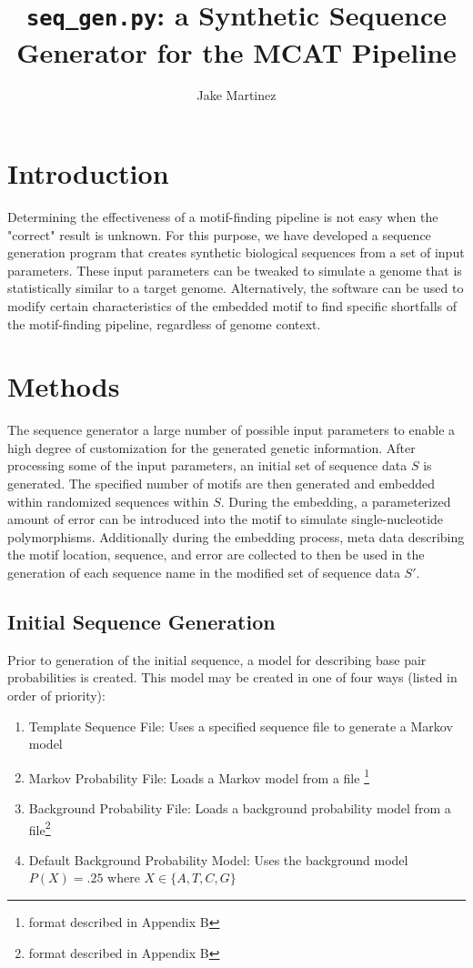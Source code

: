 \documentclass[12pt]{article}
\title{\texttt{seq\_gen.py}: a Synthetic Sequence Generator for the MCAT Pipeline}
\author{Jake Martinez}
\begin{document}
\maketitle

\section{Introduction}
Determining the effectiveness of a motif-finding pipeline is not easy when the "correct" result is unknown. For this purpose, we have developed a sequence generation program that creates synthetic biological sequences from a set of input parameters. These input parameters can be tweaked to simulate a genome that is statistically similar to a target genome. Alternatively, the software can be used to modify certain characteristics of the embedded motif to find specific shortfalls of the motif-finding pipeline, regardless of genome context.

\section{Methods}
The sequence generator a large number of possible input parameters to enable a high degree of customization for the generated genetic information. After processing some of the input parameters, an initial set of sequence data $S$ is generated. The specified number of motifs are then generated and embedded within randomized sequences within $S$. During the embedding, a parameterized amount of error can be introduced into the motif to simulate single-nucleotide polymorphisms. Additionally during the embedding process, meta data describing the motif location, sequence, and error are collected to then be used in the generation of each sequence name in the modified set of sequence data $S'$.

\subsection{Initial Sequence Generation}
Prior to generation of the initial sequence, a model for describing base pair probabilities is created. This model may be created in one of four ways (listed in order of priority): 

\begin{enumerate}
	\item Template Sequence File: Uses a specified sequence file to generate a Markov model
	\item Markov Probability File: Loads a Markov model from a file \footnote{format described in Appendix B}
	\item Background Probability File: Loads a background probability model from a file\footnote{format described in Appendix B}
	\item Default Background Probability Model: Uses the background model $P(X)=.25$ where $X\in\{A,T,C,G\}$
\end{enumerate}
\end{document}
